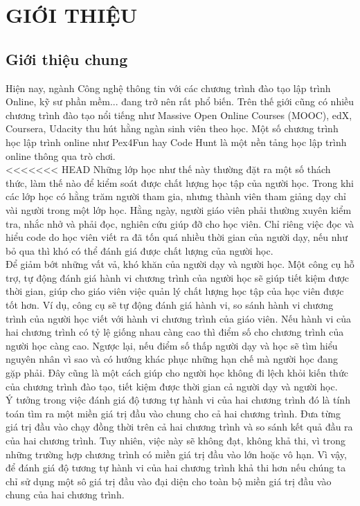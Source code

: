 \newpage
\chapter{GIỚI THIỆU}
\section{Giới thiệu chung}
Hiện nay, ngành Công nghệ thông tin với các chương trình đào tạo lập trình Online, kỹ sư phần mềm... đang trở nên rất phổ biến. Trên thế giới cũng có nhiều chương trình đào tạo nổi tiếng như Massive Open Online Courses (MOOC), edX, Coursera, Udacity thu hút hằng ngàn sinh viên theo học. Một số chương trình học lập trình online như Pex4Fun hay Code Hunt là một nền tảng học lập trình online thông qua trò chơi.\\

<<<<<<< HEAD
Những lớp học như thế này thường đặt ra một số thách thức, làm thế nào để kiểm soát được chất lượng học tập của người học. Trong khi các lớp học có hằng trăm người tham gia, nhưng thành viên tham giảng dạy chỉ vài người trong một lớp học. Hằng ngày, người giáo viên phải thường xuyên kiểm tra, nhắc nhở và phải đọc, nghiên cứu giúp đỡ cho học viên. Chỉ riêng việc đọc và hiểu code do học viên viết ra đã tốn quá nhiều thời gian của người dạy, nếu như bỏ qua thì khó có thể đánh giá được chất lượng của người học.\\

Để giảm bớt những vất vả, khó khăn của người dạy và người học. Một công cụ hỗ trợ, tự động đánh giá hành vi chương trình của người học sẽ giúp tiết kiệm được thời gian, giúp cho giáo viên việc quản lý chất lượng học tập của học viên được tốt hơn. Ví dụ, công cụ sẽ tự động đánh giá hành vi, so sánh hành vi chương trình của người học viết với hành vi chương trình của giáo viên. Nếu hành vi của hai chương trình có tỷ lệ giống nhau càng cao thì điểm số cho chương trình của người học càng cao. Ngược lại, nếu điểm số thấp người dạy và học sẽ tìm hiểu nguyên nhân vì sao và có hướng khác phục những hạn chế mà người học đang gặp phải. Đây cũng là một cách giúp cho người học không đi lệch khỏi kiến thức của chương trình đào tạo, tiết kiệm được thời gian cả người dạy và người học.\\

Ý tưởng trong việc đánh giá độ tương tự hành vi của hai chương trình đó là tính toán tìm ra một miền giá trị đầu vào chung cho cả hai chương trình. Đưa từng giá trị đầu vào chạy đồng thời trên cả hai chương trình và so sánh kết quả đầu ra của hai chương trình. Tuy nhiên, việc này sẽ không đạt, không khả thi, vì trong những trường hợp chương trình có miền giá trị đầu vào lớn hoặc vô hạn. Vì vậy, để đánh giá độ tương tự hành vi của hai chương trình khả thi hơn nếu chúng ta chỉ sử dụng một sô giá trị đầu vào đại diện cho toàn bộ miền giá trị đầu vào chung của hai chương trình.\\

